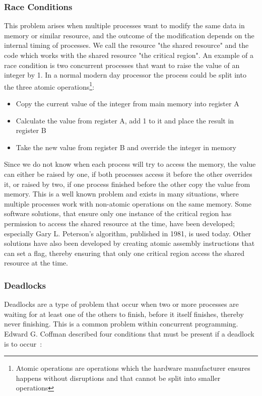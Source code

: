 \subsubsection{Race Conditions}
This problem arises when multiple processes want to modify the same data in memory or similar resource, and the outcome of the modification depends on the internal timing of processes. We call the resource "the shared resource" and the code which works with the shared resource "the critical region". An example of a race condition is two concurrent processes that want to raise the value of an integer by 1. In a normal modern day processor the process could be split into the three atomic operations\footnote{Atomic operations are operations which the hardware manufacturer ensures happens without disruptions and that cannot be split into smaller operations}:

\begin{itemize}
\item Copy the current value of the integer from main memory into register A
\item Calculate the value from register A, add 1 to it and place the result in register B
\item Take the new value from register B and override the integer in memory
\end{itemize}

Since we do not know when each process will try to access the memory, the value can either be raised by one, if both processes access it before the other overrides it, or raised by two, if one process finished before the other copy the value from memory. This is a well known problem and exists in many situations, where multiple processes work with non-atomic operations on the same memory. Some software solutions, that ensure only one instance of the critical region has permission to access the shared resource at the time, have been developed; especially Gary L. Peterson's algorithm, published in 1981, is used today. Other solutions have also been developed by creating atomic assembly instructions that can set a flag, thereby ensuring that only one critical region access the shared resource at the time.

\subsubsection{Deadlocks}

Deadlocks are a type of problem that occur when two or more processes are waiting for at least one of the others to finish, before it itself finishes, thereby never finishing. This is a common problem within concurrent programming. Edward G. Coffman described four conditions that must be present if a deadlock is to occur~\cite{Coffman:1971}:

